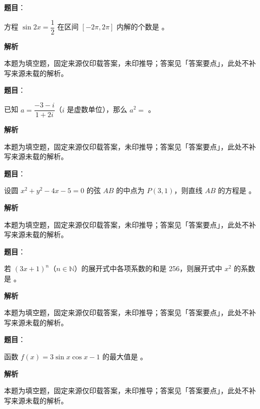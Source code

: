 \begin{answer}

\textbf{题目}：

方程 $\sin 2x=\dfrac12$ 在区间 $[-2\pi,2\pi]$ 内解的个数是 \gkblank{}。

\textbf{解析}

本题为填空题，固定来源仅印载答案，未印推导；答案见「答案要点」，此处不补写来源未载的解析。


\end{answer}
\begin{answer}

\textbf{题目}：

已知 $a=\dfrac{-3-i}{1+2i}$（$i$ 是虚数单位），那么 $a^2=$ \gkblank{}。

\textbf{解析}

本题为填空题，固定来源仅印载答案，未印推导；答案见「答案要点」，此处不补写来源未载的解析。


\end{answer}
\begin{answer}

\textbf{题目}：

设圆 $x^2+y^2-4x-5=0$ 的弦 $AB$ 的中点为 $P(3,1)$，则直线 $AB$ 的方程是 \gkblank{}。

\textbf{解析}

本题为填空题，固定来源仅印载答案，未印推导；答案见「答案要点」，此处不补写来源未载的解析。


\end{answer}
\begin{answer}

\textbf{题目}：

若 $(3x+1)^n$（$n\in\mathbb N$）的展开式中各项系数的和是 256，则展开式中 $x^2$ 的系数是 \gkblank{}。

\textbf{解析}

本题为填空题，固定来源仅印载答案，未印推导；答案见「答案要点」，此处不补写来源未载的解析。


\end{answer}
\begin{answer}

\textbf{题目}：

函数 $f(x)=3\sin x\cos x-1$ 的最大值是 \gkblank{}。

\textbf{解析}

本题为填空题，固定来源仅印载答案，未印推导；答案见「答案要点」，此处不补写来源未载的解析。


\end{answer}
